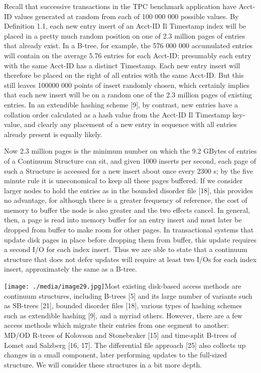 \documentclass[a4paper,11pt,notitlepage,twoside,openright]{article}
\begin{document}
Recall that successive transactions in the TPC benchmark application
have Acct-ID values generated at random from each of 100 000 000
possible values. By Definition 1.1, each new entry insert of an Acct-ID
Il Timestamp index will be placed in a pretty much random position on
one of 2.3 million pages of entries that already exist. In a B-tree, for
example, the 576 000 000 accumulated entries will contain on the average
5.76 entries for each Acct-ID; presumably each entry with the same
Acct-ID has a distinct Timestamp. Each new entry insert will therefore
be placed on the right of all entries with the same Acct-ID. But this
still leaves 100000 000 points of insert randomly chosen, which
certainly implies that each new insert will be on a random one of the
2.3 million pages of existing entries. In an extendible hashing scheme
{[}9{]}, by contrast, new entries have a collation order calculated as a
hash value from the Acct-ID Il Timestamp key-value, and clearly any
placement of a new entry in sequence with all entries already present is
equally likely.

Now 2.3 million pages is the minimum number on which the 9.2 GBytes of
entries of a Continuum Structure can sit, and given 1000 inserts per
second, each page of such a Structure is accessed for a new insert about
once every 2300 s; by the five minute rule it is uneconomical to keep
all these pages buffered. If we consider larger nodes to hold the
entries as in the bounded disorder file {[}18{]}, this provides no
advantage, for although there is a greater frequency of reference, the
cost of memory to buffer the node is also greater and the two effects
cancel. In general, then, a page is read into memory buffer for an entry
insert and must later be dropped from buffer to make room for other
pages. In transactional systems that update disk pages in place before
dropping them from buffer, this update requires a second I/O for each
index insert. Thus we are able to state that a continuum structure that
does not defer updates will require at least two I/Os for each index
insert, approximately the same as a B-tree.

\texttt{[image: ./media/image29.jpg]}Most existing disk-based access
methods are continuum structures, including B-trees {[}5{]} and its
large number of variants such as SB-trees {[}21{]}, bounded disorder
files {[}18{]}, various types of hashing schemes such as extendible
hashing {[}9{]}, and a myriad others. However, there are a few access
methods which migrate their entries from one segment to another: MD/OD
R-trees of Kolovson and Stonebraker {[}15{]} and time-split B-trees of
Lomet and Salzberg {[}16, 17{]}. The differential file approach {[}25{]}
also collects up changes in a small component, later performing updates
to the full-sized structure. We will consider these structures in a bit
more depth.
\end{document}
